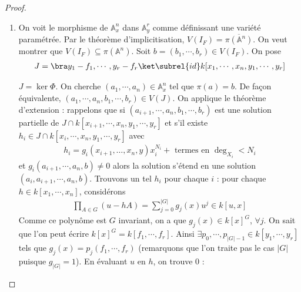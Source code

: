             \begin{proof}
                \begin{enumerate}
                    \item On voit le morphisme de $\mathbb{A}^n_x$ dans $\mathbb{A}^r_y$ comme définissant une variété paramétrée. Par le théorème d'implicitisation, $V(I_F) = \overline{\pi(\mathbb{A}^n)}$. On veut montrer que $V(I_F) \subseteq \pi(\mathbb{A}^n)$. Soit $b = (b_1, \cdots, b_r) \in V(I_F)$. On pose 
                    \begin{align*}
                        J = \bra y_1 - f_1, \cdots, y_r - f_r \ket \subrel{id} k[x_1, \cdots, x_n, y_1, \cdots, y_r]
                    \end{align*}
                    \begin{figure}[H]
                        \centering
                    \end{figure}
                    $J = \ker \Phi$. On cherche $(a_1, \cdots, a_n) \in \mathbb{A}^n_x$ tel que $\pi(a) = b$. De façon équivalente, $(a_1, \cdots, a_n, b_1, \cdots, b_r) \in V(J)$. On applique le théorème d'extension : rappelons que si $(a_{i+1}, \cdots, a_n, b_1, \cdots, b_r)$ est une solution partielle de $J \cap k[x_{i+1}, \cdots, x_n, y_1, \cdots, y_r]$ et s'il existe $h_i \in J \cap k[x_i, \cdots, x_n, y_1, \cdots, y_r]$ avec 
                    \begin{align*}
                        h_i = g_i(x_{i+1}, \dots, x_n, y)x_i^{N_i} + \text{ termes en }\deg_{X_i} < N_i
                    \end{align*} 
                    et $g_i(a_{i + 1}, \cdots, a_n, b) \neq 0$ alors la solution s'étend en une solution $(a_i, a_{i+1}, \cdots, a_n, b)$. Trouvons un tel $h_i$ pour chaque $i$ : pour chaque $h \in k[x_1, \cdots, x_n]$, considérons
                    \begin{align*}
                        \prod_{A \in G} (u - hA) = \sum_{j = 0}^{|G|} g_j(x)u^j \in k[u,x]
                    \end{align*}
                    Comme ce polynôme est $G$ invariant, on a que $g_j(x) \in k[x]^G$, $\forall j$. On sait que l'on peut écrire $k[x]^G = k[f_1, \cdots, f_r]$. Ainsi $\exists p_0, \cdots, p_{|G| - 1} \in k[y_1, \cdots, y_r]$ tels que $g_j(x) = p_j(f_1, \cdots, f_r)$ (remarquons que l'on traite pas le cas $|G|$ puisque $g_{|G|} = 1$). En évaluant $u$ en $h$, on trouve $0$ :

\end{enumerate}
\end{proof}
